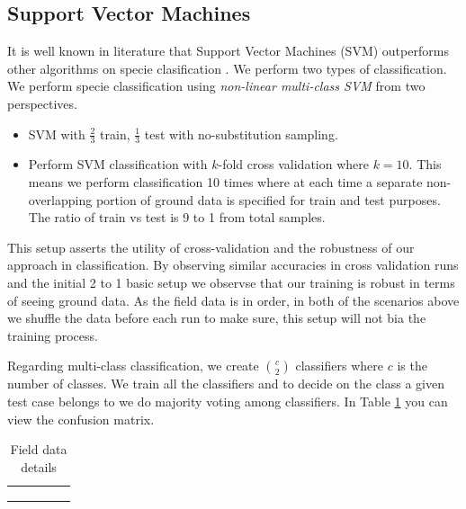 \documentclass[remotesensing,article,accept,moreauthors,pdftex,12pt,a4paper]{mdpi}
\begin{document}
\subsection{Support Vector Machines}

It is well known in literature that Support Vector Machines (SVM) outperforms other algorithms on specie clasification \cite{colgan2012mapping, baldeck2014landscape, cho2012mapping}. We perform two types of classification. We perform specie classification using \textit{non-linear multi-class SVM} from two perspectives. 


\begin{itemize}
\item SVM with $\frac{2}{3}$ train, $\frac{1}{3}$ test with no-substitution sampling.
\item Perform SVM classification with $k$-fold cross validation where $k=10$. This means we perform classification 10 times where at each time a separate non-overlapping portion of ground data is specified for train and test purposes. The ratio of train vs test is 9 to 1 from total samples.
\end{itemize}

This setup asserts the utility of cross-validation and the robustness of our approach in classification. By observing similar accuracies in cross validation runs and the initial 2 to 1 basic setup we observse that our training is robust in terms of seeing ground data. As the field data is in order, in both of the scenarios above we shuffle the data before each run to make sure, this setup will not bia the training process.

Regarding multi-class classification, we create $\binom{c}{2}$ classifiers where $c$ is the number of classes. We train all the classifiers and to decide on the class a given test case belongs to we do majority voting among classifiers. In Table \ref{table:confusion matrix} you can view the confusion matrix.


\begin{table}[h]
\begin{center}

\begin{tabular}{| l | l | l | l | l |}
\hline
 &  &  &  &  \\ \hline
 &  &  &  &  \\ \hline
 &  &  &  &  \\ \hline
 &  &  &  &  \\ \hline
\end{tabular}
    \caption{Field data details}
    \label{table:confusion matrix}\end{center}

\end{table}
\end{document}
